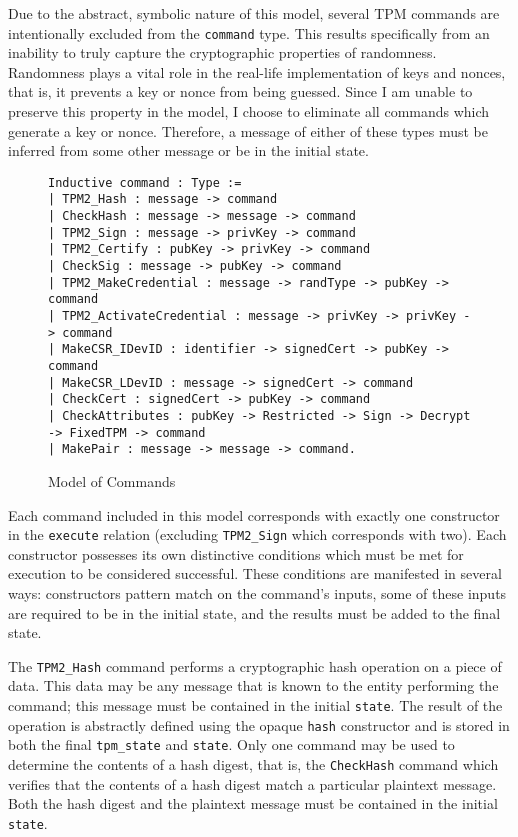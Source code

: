 Due to the abstract, symbolic nature of this model, several TPM commands are intentionally excluded from the \verb|command| type. This results specifically from an inability to truly capture the cryptographic properties of randomness. Randomness plays a vital role in the real-life implementation of keys and nonces, that is, it prevents a key or nonce from being guessed. Since I am unable to preserve this property in the model, I choose to eliminate all commands which generate a key or nonce. Therefore, a message of either of these types must be inferred from some other message or be in the initial state. 
\begin{figure}[h]
\begin{lstlisting}[language=Coq]
Inductive command : Type :=
| TPM2_Hash : message -> command
| CheckHash : message -> message -> command
| TPM2_Sign : message -> privKey -> command
| TPM2_Certify : pubKey -> privKey -> command
| CheckSig : message -> pubKey -> command
| TPM2_MakeCredential : message -> randType -> pubKey -> command
| TPM2_ActivateCredential : message -> privKey -> privKey -> command
| MakeCSR_IDevID : identifier -> signedCert -> pubKey -> command
| MakeCSR_LDevID : message -> signedCert -> command
| CheckCert : signedCert -> pubKey -> command
| CheckAttributes : pubKey -> Restricted -> Sign -> Decrypt -> FixedTPM -> command
| MakePair : message -> message -> command.
\end{lstlisting}
\caption{Model of Commands}
\end{figure}
Each command included in this model corresponds with exactly one constructor in the \verb|execute| relation (excluding \verb|TPM2_Sign| which corresponds with two). Each constructor possesses its own distinctive conditions which must be met for execution to be considered successful. These conditions are manifested in several ways: constructors pattern match on the command's inputs, some of these inputs are required to be in the initial state, and the results must be added to the final state. 





The \verb|TPM2_Hash| command performs a cryptographic hash operation on a piece of data. This data may be any message that is known to the entity performing the command; this message must be contained in the initial \verb|state|. The result of the operation is abstractly defined using the opaque \verb|hash| constructor and is stored in both the final \verb|tpm_state| and \verb|state|. Only one command may be used to determine the contents of a hash digest, that is, the \verb|CheckHash| command which verifies that the contents of a hash digest match a particular plaintext message. Both the hash digest and the plaintext message must be contained in the initial \verb|state|.



